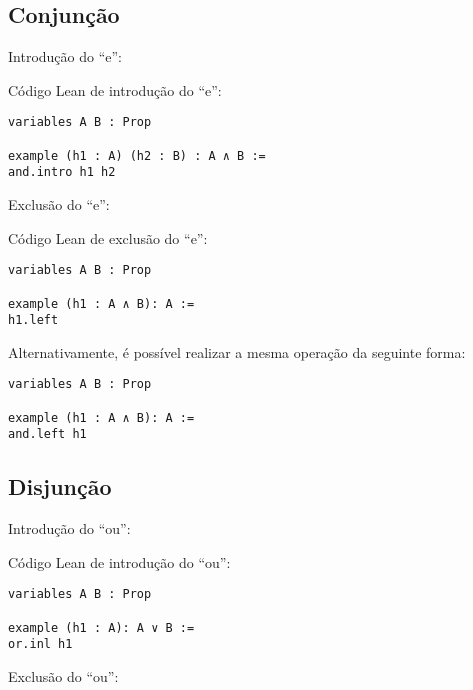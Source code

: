 \subsection{Conjunção}

Introdução do ``e'':
 \begin{prooftree}
\end{prooftree}



Código Lean de introdução do ``e'':
\begin{lstlisting} 
variables A B : Prop

example (h1 : A) (h2 : B) : A ∧ B :=
and.intro h1 h2
\end{lstlisting}


Exclusão do ``e'':
 \begin{prooftree}
\end{prooftree}

Código Lean de exclusão do ``e'': 
\begin{lstlisting} 
variables A B : Prop

example (h1 : A ∧ B): A :=
h1.left
\end{lstlisting}

Alternativamente, é possível realizar a mesma operação da seguinte forma: 
\begin{lstlisting} 
variables A B : Prop

example (h1 : A ∧ B): A :=
and.left h1
\end{lstlisting}
\subsection{Disjunção}

Introdução do ``ou'':
\begin{prooftree}
\end{prooftree}

Código Lean de introdução do ``ou'':
\begin{lstlisting} 
variables A B : Prop

example (h1 : A): A ∨ B :=
or.inl h1
\end{lstlisting} 

Exclusão do ``ou'': 

  \begin{prooftree}
     \end{prooftree}
     
